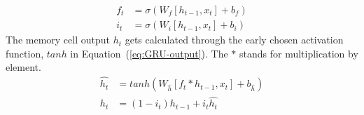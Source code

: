 \begin{equation}
    \begin{split}
        f_t &= \sigma \left (W_{f} \left [h_{t-1}, x_t \right ] + b_f \right ) \\
        i_t &= \sigma \left (W_{i} \left [h_{t-1}, x_t \right ] + b_i \right )
    \end{split}
    \label{eq:GRU-gates}
\end{equation}
The memory cell output $h_t$ gets calculated through the early chosen activation function, $tanh$ in \mbox{Equation~(\ref{eq:GRU-output})}.
The $\ast$ stands for multiplication by element.
\begin{equation}
    \begin{split}
        \hat{h_t} &= tanh \left (W_{\hat{h}} \left [f_t \ast h_{t-1}, x_t \right ] + b_{\hat{h}} \right ) \\
        h_t &= \left (1-i_t \right ) h_{t-1}+i_t \hat{h_t}
    \end{split}
    \label{eq:GRU-output}
\end{equation}
%
%
%
%
%

